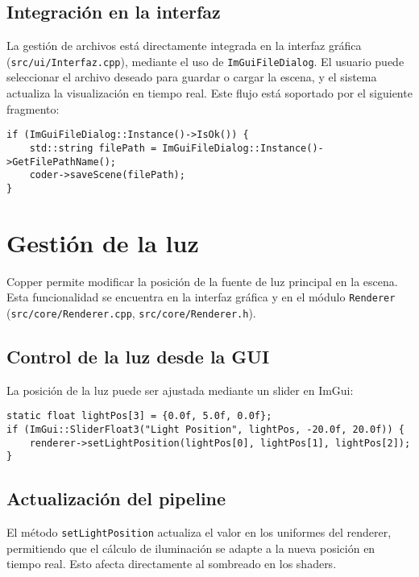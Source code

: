 \subsection{Integración en la interfaz}

La gestión de archivos está directamente integrada en la interfaz gráfica
(\texttt{src/ui/Interfaz.cpp}), mediante el uso de \texttt{ImGuiFileDialog}. El
usuario puede seleccionar el archivo deseado para guardar o cargar la escena, y
el sistema actualiza la visualización en tiempo real. Este flujo está soportado
por el siguiente fragmento:

\begin{verbatim}
if (ImGuiFileDialog::Instance()->IsOk()) {
    std::string filePath = ImGuiFileDialog::Instance()->GetFilePathName();
    coder->saveScene(filePath);
}
\end{verbatim}

\section{Gestión de la luz}

Copper permite modificar la posición de la fuente de luz principal en la
escena. Esta funcionalidad se encuentra en la interfaz gráfica y en el módulo
\texttt{Renderer} (\texttt{src/core/Renderer.cpp},
\texttt{src/core/Renderer.h}).

\subsection{Control de la luz desde la GUI}

La posición de la luz puede ser ajustada mediante un slider en ImGui:

\begin{verbatim}
static float lightPos[3] = {0.0f, 5.0f, 0.0f};
if (ImGui::SliderFloat3("Light Position", lightPos, -20.0f, 20.0f)) {
    renderer->setLightPosition(lightPos[0], lightPos[1], lightPos[2]);
}
\end{verbatim}

\subsection{Actualización del pipeline}

El método \texttt{setLightPosition} actualiza el valor en los uniformes del
renderer, permitiendo que el cálculo de iluminación se adapte a la nueva
posición en tiempo real. Esto afecta directamente al sombreado en los shaders.

